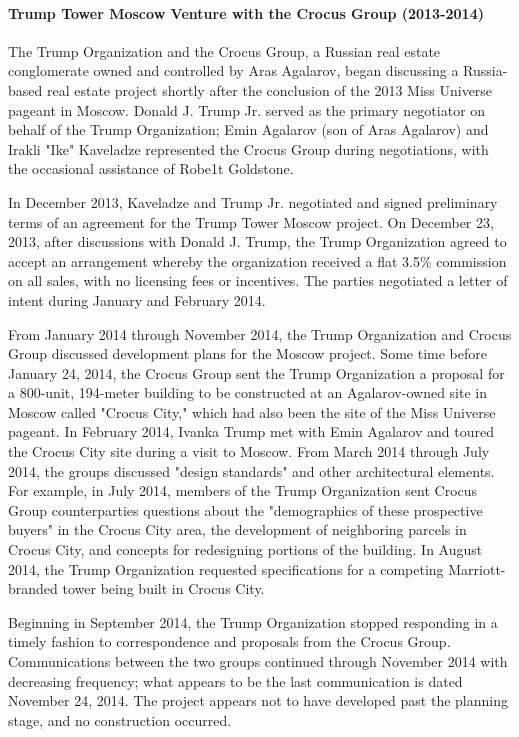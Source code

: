 \paragraph{Trump Tower Moscow Venture with the Crocus Group (2013-2014)}

The Trump Organization and the Crocus Group, a Russian real estate conglomerate owned and controlled by Aras Agalarov, began discussing a Russia-based real estate project shortly after the conclusion of the 2013 Miss Universe pageant in Moscow.
Donald J. Trump Jr. served as the primary negotiator on behalf of the Trump Organization; Emin Agalarov (son of Aras Agalarov) and Irakli "Ike" Kaveladze represented the Crocus Group during negotiations, with the occasional assistance of Robe1t Goldstone.

In December 2013, Kaveladze and Trump Jr. negotiated and signed preliminary terms of an agreement for the Trump Tower Moscow project.
On December 23, 2013, after discussions with Donald J. Trump, the Trump Organization agreed to accept an arrangement whereby the organization received a flat 3.5\% commission on all sales, with no licensing fees or incentives.
The parties negotiated a letter of intent during January and February 2014.

From January 2014 through November 2014, the Trump Organization and Crocus Group discussed development plans for the Moscow project.
Some time before January 24, 2014, the Crocus Group sent the Trump Organization a proposal for a 800-unit, 194-meter building to be constructed at an Agalarov-owned site in Moscow called "Crocus City," which had also been the site of the Miss Universe pageant.
In February 2014, Ivanka Trump met with Emin Agalarov and toured the Crocus City site during a visit to Moscow.
From March 2014 through July 2014, the groups discussed "design standards" and other architectural elements.
For example, in July 2014, members of the Trump Organization sent Crocus Group counterparties questions about the "demographics of these prospective buyers" in the Crocus City area, the development of neighboring parcels in Crocus City, and concepts for redesigning portions of the building.
In August 2014, the Trump Organization requested specifications for a competing Marriott-branded tower being built in Crocus City.

Beginning in September 2014, the Trump Organization stopped responding in a timely fashion to correspondence and proposals from the Crocus Group.
Communications between the two groups continued through November 2014 with decreasing frequency; what appears to be the last communication is dated November 24, 2014.
The project appears not to have developed past the planning stage, and no construction occurred.

